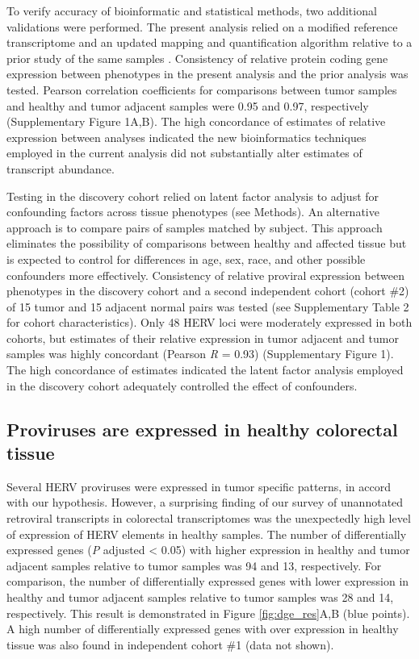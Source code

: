 To verify accuracy of bioinformatic and statistical methods, two additional validations were performed.
The present analysis relied on a modified reference transcriptome and an updated mapping and quantification algorithm relative to a prior study of the same samples \citep{Dampier2020}.
Consistency of relative protein coding gene expression between phenotypes in the present analysis and the prior analysis was tested.
Pearson correlation coefficients for comparisons between tumor samples and healthy and tumor adjacent samples were 0.95 and 0.97, respectively (Supplementary Figure 1A,B).
The high concordance of estimates of relative expression between analyses indicated the new bioinformatics techniques employed in the current analysis did not substantially alter estimates of transcript abundance.

Testing in the discovery cohort relied on latent factor analysis to adjust for confounding factors across tissue phenotypes (see Methods).
An alternative approach is to compare pairs of samples matched by subject.
This approach eliminates the possibility of comparisons between healthy and affected tissue but is expected to control for differences in age, sex, race, and other possible confounders more effectively.
Consistency of relative proviral expression between phenotypes in the discovery cohort and a second independent cohort (cohort \#2) of 15 tumor and 15 adjacent normal pairs was tested (see Supplementary Table 2 for cohort characteristics).
Only 48 HERV loci were moderately expressed in both cohorts, but estimates of their relative expression in tumor adjacent and tumor samples was highly concordant (Pearson \emph{R} = 0.93) (Supplementary Figure 1).
The high concordance of estimates indicated the latent factor analysis employed in the discovery cohort adequately controlled the effect of confounders.


\subsection*{Proviruses are expressed in healthy colorectal tissue}
Several HERV proviruses were expressed in tumor specific patterns, in accord with our hypothesis.
However, a surprising finding of our survey of unannotated retroviral transcripts in colorectal transcriptomes was the unexpectedly high level of expression of HERV elements in healthy samples.
The number of differentially expressed genes (\emph{P} adjusted < 0.05) with higher expression in healthy and tumor adjacent samples relative to tumor samples was 94 and 13, respectively.
For comparison, the number of differentially expressed genes with lower expression in healthy and tumor adjacent samples relative to tumor samples was 28 and 14, respectively.
This result is demonstrated in Figure \ref{fig:dge_res}A,B (blue points).
A high number of differentially expressed genes with over expression in healthy tissue was also found in independent cohort \#1 (data not shown).

